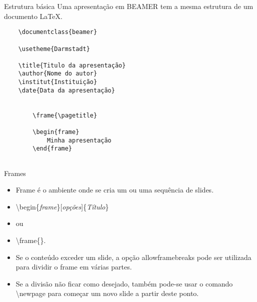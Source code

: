 \begin{frame}[fragile]{Estrutura básica}
    Uma apresentação em {\footnotesize BEAMER} tem a mesma estrutura de um documento \LaTeX.
    
{\footnotesize
\begin{verbatim}
    \documentclass{beamer}

    \usetheme{Darmstadt}

    \title{Titulo da apresentação}
    \author{Nome do autor}
    \institut{Instituição}
    \date{Data da apresentação}

    
        \frame{\pagetitle}

        \begin{frame}
            Minha apresentação
        \end{frame}
    
\end{verbatim}
}
\end{frame}

\begin{frame}[fragile]{Frames}
    \begin{itemize}
    \item Frame é o ambiente onde se cria um ou uma sequência de slides.
    \item[] \alert{\textbackslash begin\{\textit{frame}\}[\textit{opções}]\{\textit{Título}\}}
    \item[] ou
    \item[] \alert{\textbackslash frame\{\}}.
    \item Se o conteúdo exceder um slide, a opção \alert{allowframebreaks} pode ser utilizada para dividir o frame em várias partes.
    \item Se a divisão não ficar como desejado, também pode-se usar o comando \alert{\textbackslash newpage} para começar um novo slide a partir deste ponto.
    \end{itemize}
\end{frame}


